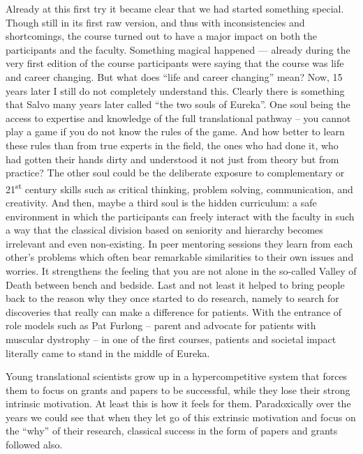 \documentclass[authordate, editorial]{jote-new-article}
\begin{document}
	Already at this first try it became clear that we had started something special. Though still in its first raw version, and thus with inconsistencies and shortcomings, the course turned out to have a major impact on both the participants and the faculty. Something magical happened — already during the very first edition of the course participants were saying that the course was life and career changing. But what does “life and career changing” mean? Now, 15 years later I still do not completely understand this. Clearly there is something that Salvo many years later called “the two souls of Eureka”. One soul being the access to expertise and knowledge of the full translational pathway -- you cannot play a game if you do not know the rules of the game. And how better to learn these rules than from true experts in the field, the ones who had done it, who had gotten their hands dirty and understood it not just from theory but from practice? The other soul could be the deliberate exposure to complementary or 21\textsuperscript{st} century skills such as critical thinking, problem solving, communication, and creativity. And then, maybe a third soul is the hidden curriculum: a safe environment in which the participants can freely interact with the faculty in such a way that the classical division based on seniority and hierarchy becomes irrelevant and even non-existing. In peer mentoring sessions they learn from each other's problems which often bear remarkable similarities to their own issues and worries. It strengthens the feeling that you are not alone in the so-called Valley of Death between bench and bedside. Last and not least it helped to bring people back to the reason why they once started to do research, namely to search for discoveries that really can make a difference for patients. With the entrance of role models such as Pat Furlong -- parent and advocate for patients with muscular dystrophy -- in one of the first courses, patients and societal impact literally came to stand in the middle of Eureka.



	Young translational scientists grow up in a hypercompetitive system that forces them to focus on grants and papers to be successful, while they lose their strong intrinsic motivation. At least this is how it feels for them. Paradoxically over the years we could see that when they let go of this extrinsic motivation and focus on the “why” of their research, classical success in the form of papers and grants followed also.
\end{document}

